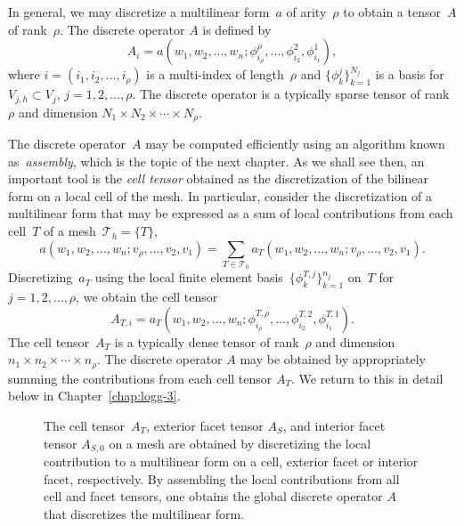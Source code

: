 In general, we may discretize a multilinear form~$a$ of arity~$\rho$
to obtain a tensor~$A$ of rank~$\rho$. The discrete operator $A$ is
defined by
\begin{equation}
  A_i = a(w_1, w_2, \ldots, w_n;
  \phi^{\rho}_{i_{\rho}}, \ldots, \phi^2_{i_2}, \phi^1_{i_1}),
\end{equation}
where $i = (i_1, i_2, \ldots, i_{\rho})$ is a multi-index of
length~$\rho$ and $\{\phi^j_k\}_{k=1}^{N_j}$ is a basis for $V_{j,h}
\subset V_j$, $j = 1,2,\ldots,\rho$. The discrete operator is a
typically sparse tensor of rank~$\rho$ and dimension $N_1 \times N_2
\times \cdots \times N_{\rho}$.

The discrete operator~$A$ may be computed efficiently using an
algorithm known as~\emph{assembly}, which is the topic of the next
chapter. As we shall see then, an important tool is the \emph{cell
  tensor} obtained as the discretization of the bilinear form on a
local cell of the mesh. In particular, consider the discretization of
a multilinear form that may be expressed as a sum of local
contributions from each cell~$T$ of a mesh~$\mathcal{T}_h = \{T\}$,
\begin{equation}
  a(w_1, w_2, \ldots, w_n; v_{\rho}, \ldots, v_2, v_1)
  = \sum_{T\in\mathcal{T}_h}
  a_T(w_1, w_2, \ldots, w_n; v_{\rho}, \ldots, v_2, v_1).
\end{equation}
Discretizing~$a_T$ using the local finite element
basis~$\{\phi^{T,j}_k\}_{k=1}^{n_j}$ on~$T$ for $j = 1,
2, \ldots, \rho$, we obtain the cell tensor
\begin{equation} \label{eq:kirby-5:celltensor}
  A_{T,i}
  = a_T(w_1, w_2, \ldots, w_n;
        \phi^{T,\rho}_{i_{\rho}}, \ldots, \phi^{T,2}_{i_2}, \phi^{T,1}_{i_1}).
\end{equation}
The cell tensor~$A_T$ is a typically dense tensor of rank~$\rho$ and
dimension $n_1 \times n_2 \times \cdots \times n_{\rho}$. The discrete
operator $A$ may be obtained by appropriately summing the
contributions from each cell tensor $A_T$. We return to this in detail
below in Chapter~\ref{chap:logg-3}.

\begin{figure}
\bwfig
\centering
  \caption{The cell tensor~$A_T$, exterior facet tensor $A_S$, and
    interior facet tensor $A_{S,0}$ on a mesh are obtained by
    discretizing the local contribution to a multilinear form on a
    cell, exterior facet or interior facet, respectively. By
    assembling the local contributions from all cell and facet
    tensors, one obtains the global discrete operator $A$ that
    discretizes the multilinear form.}
  \label{fig:kirby-5:tensors}
\vspace*{-12pt}
\end{figure}

